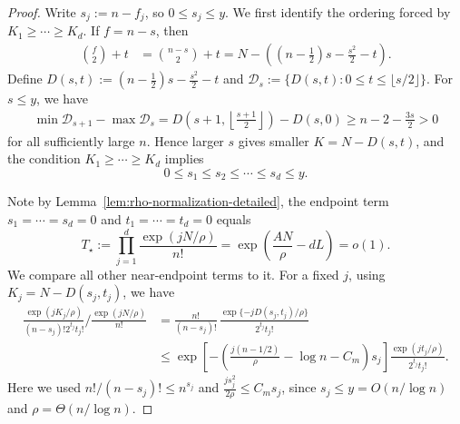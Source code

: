 \documentclass[11pt,reqno]{amsart}
\theoremstyle{definition}
\theoremstyle{remark}
\renewcommand\le{\leqslant}
\renewcommand\ge{\geqslant}
\begin{document}
\begin{proof}
Write $s_j:=n-f_j$, so $0\le s_j\le y$. We first identify the ordering forced by $K_1\ge\cdots\ge K_d$. If $f=n-s$, then
\begin{align*}
        \binom f2+t
        &=\binom{n-s}{2}+t
          =N-\left(\left(n-\frac12\right)s-\frac{s^2}{2}-t\right).
\end{align*}
Define $D(s,t):=\left(n-\frac12\right)s-\frac{s^2}{2}-t$ and $\mathcal D_s:=\{D(s,t):0\le t\le\lfloor s/2\rfloor\}.$ For $s\le y$, we have
\begin{align*}
\min \mathcal D_{s+1}-\max \mathcal D_s
=D\left(s+1,\left\lfloor\frac{s+1}{2}\right\rfloor\right)-D(s,0) \ge n-2-\frac{3s}{2}>0
\end{align*}
for all sufficiently large $n$. Hence larger $s$ gives smaller $K=N-D(s,t)$, and the condition $K_1\ge\cdots\ge K_d$ implies
\begin{equation}\label{eq:defect-ordering-detailed}
        0\le s_1\le s_2\le\cdots\le s_d\le y .
\end{equation}

Note by Lemma~\ref{lem:rho-normalization-detailed}, the endpoint term $s_1=\cdots=s_d=0$ and $t_1=\cdots=t_d=0$ equals
\[
        T_\star:=\prod_{j=1}^d\frac{\exp(jN/\rho)}{n!}
        =\exp\left(\frac{AN}{\rho}-dL\right)=o(1).
\]
We compare all other near-endpoint terms to it. For a fixed $j$, using $K_j=N-D(s_j,t_j)$, we have
\begin{align*}
 \frac{\exp(jK_j/\rho)}{(n-s_j)!2^{t_j}t_j!}
 \bigg/ \frac{\exp(jN/\rho)}{n!}
 &=\frac{n!}{(n-s_j)!}\,
   \frac{\exp\{-jD(s_j,t_j)/\rho\}}{2^{t_j}t_j!}                 \\
 &\le \exp\left[-\left(\frac{j(n-1/2)}\rho-\log n-C_m\right)s_j\right]
       \frac{\exp(jt_j/\rho)}{2^{t_j}t_j!}.
\end{align*}
Here we used $n!/(n-s_j)!\le n^{s_j}$ and $\frac{j s_j^2}{2\rho}\le C_m s_j $, since $s_j\le y=O(n/\log n)$ and $\rho=\Theta(n/\log n)$.


\end{proof}
\end{document}
